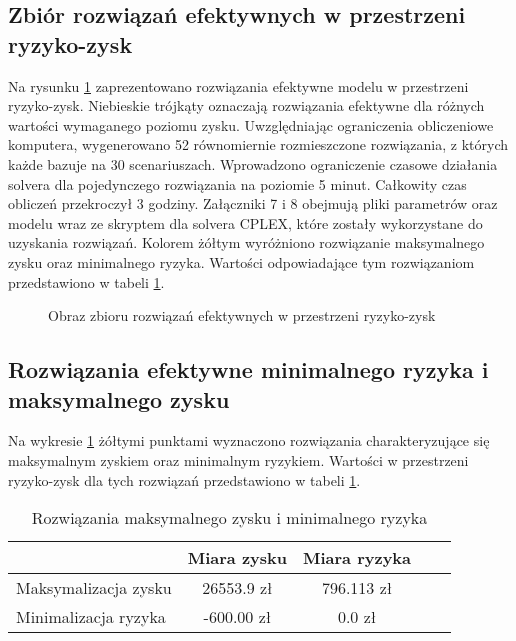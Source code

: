\documentclass[11pt,a4paper]{article}
\begin{document}
\subsection{Zbiór rozwiązań efektywnych w przestrzeni ryzyko-zysk}
Na rysunku \ref{fig:profit-risk} zaprezentowano rozwiązania efektywne modelu w przestrzeni ryzyko-zysk. Niebieskie trójkąty oznaczają rozwiązania efektywne dla różnych wartości wymaganego poziomu zysku. Uwzględniając ograniczenia obliczeniowe komputera, wygenerowano 52 równomiernie rozmieszczone rozwiązania, z których każde bazuje na 30 scenariuszach. Wprowadzono ograniczenie czasowe działania solvera dla pojedynczego rozwiązania na poziomie 5 minut. Całkowity czas obliczeń przekroczył 3 godziny. Załączniki 7 i 8 obejmują pliki parametrów oraz modelu wraz ze skryptem dla solvera CPLEX, które zostały wykorzystane do uzyskania rozwiązań. Kolorem żółtym wyróżniono rozwiązanie maksymalnego zysku oraz minimalnego ryzyka. Wartości odpowiadające tym rozwiązaniom przedstawiono w tabeli \ref{tab:min-max}.
\begin{figure}[ht!]
\centering
\caption{Obraz zbioru rozwiązań efektywnych w przestrzeni ryzyko-zysk}
\label{fig:profit-risk}
\end{figure}

\subsection{Rozwiązania efektywne minimalnego ryzyka i maksymalnego zysku}

Na wykresie \ref{fig:profit-risk} żółtymi punktami wyznaczono rozwiązania charakteryzujące się maksymalnym zyskiem oraz minimalnym ryzykiem. Wartości w przestrzeni ryzyko-zysk dla tych rozwiązań przedstawiono w tabeli \ref{tab:min-max}.

\begin{table}[ht!]
\label{tab:min-max}
  \caption{Rozwiązania maksymalnego zysku i minimalnego ryzyka}
  \centering
  \begin{tabular}{l*{4}{c}}
  
  	\hline
              			& Miara zysku & Miara ryzyka \\
	\hline
	Maksymalizacja zysku	& 26553.9 zł & 796.113 zł \\
	Minimalizacja ryzyka   	& -600.00 zł & 0.0 zł \\ 
	\hline
	
	\end{tabular}
	\end{table}
	
\end{document}
